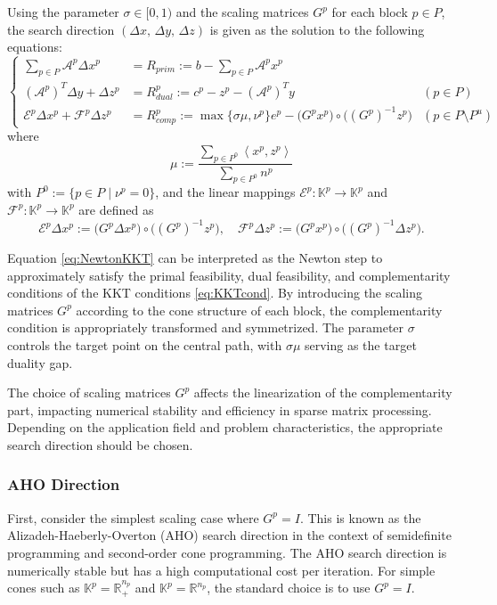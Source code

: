 Using the parameter $\sigma \in [0,1)$ and the scaling matrices $G^p$ for each block $p \in P$, the search direction $(\Delta x,\, \Delta y,\, \Delta z)$ is given as the solution to the following equations:
\begin{equation}
    \renewcommand{\arraystretch}{2.5}
    \left\{
    \begin{array}{rll}
         \sum_{p \in P} \mathcal{A}^p \Delta x^p & = R_{prim} := b - \sum_{p \in P} \mathcal{A}^p x^p &  \\
         (\mathcal{A}^p)^T \Delta y + \Delta z^p & = R_{dual}^p := c^p - z^p - (\mathcal{A}^p)^T y & (p \in P) \\
         \mathcal{E}^p \Delta x^p + \mathcal{F}^p \Delta z^p & = R_{comp}^p := \max\{\sigma \mu, \nu^p\} e^p - \big(G^p x^p\big) \circ \big((G^p)^{-1} z^p\big) & (p \in P \setminus P^u)
    \end{array}
    \right.
    \label{eq:NewtonKKT}
\end{equation}
where 
\begin{equation}
  \mu := \frac{\sum_{p \in P^0} \left\langle x^p, z^p \right\rangle}
              {\sum_{p \in P^0} n^p}
  \label{eq:mu}
\end{equation}
with $P^0 := \{p\in P \mid \nu^p=0\}$, and the linear mappings $\mathcal{E}^p : \mathbb{K}^p \to \mathbb{K}^p$ and $\mathcal{F}^p : \mathbb{K}^p \to \mathbb{K}^p$ are defined as
\[
  \mathcal{E}^p \Delta x^p
    := \big(G^p \Delta x^p\big) \circ \big((G^p)^{-1} z^p\big),
  \quad
  \mathcal{F}^p \Delta z^p
    := \big(G^p x^p\big) \circ \big((G^p)^{-1} \Delta z^p\big).
\]

Equation \eqref{eq:NewtonKKT} can be interpreted as the Newton step to approximately satisfy the primal feasibility, dual feasibility, and complementarity conditions of the KKT conditions \eqref{eq:KKTcond}.
By introducing the scaling matrices $G^p$ according to the cone structure of each block, the complementarity condition is appropriately transformed and symmetrized.
The parameter $\sigma$ controls the target point on the central path, with $\sigma \mu$ serving as the target duality gap.

The choice of scaling matrices $G^p$ affects the linearization of the complementarity part, impacting numerical stability and efficiency in sparse matrix processing.
Depending on the application field and problem characteristics, the appropriate search direction should be chosen.


\subsubsection{AHO Direction}
First, consider the simplest scaling case where $G^p = I$. 
This is known as the Alizadeh-Haeberly-Overton (AHO) search direction \cite{Alizadeh1998} in the context of semidefinite programming and second-order cone programming. 
The AHO search direction is numerically stable but has a high computational cost per iteration. 
For simple cones such as $\mathbb{K}^p = \mathbb{R}^{n_p}_+$ and $\mathbb{K}^p = \mathbb{R}^{n_p}$, the standard choice is to use $G^p = I$.


